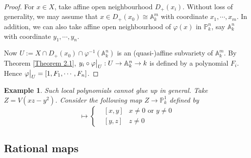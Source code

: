 \documentclass{ctexart}
\newtheorem{example}{Example}[section]
\begin{document}
\begin{proof}
    For $x\in X$, take affine open neighbourhood $D_{+}(x_{i})$.
    Without loss of generality, we may assume that $x\in D_{+}(x_{0}) \cong \mathbb{A}_{k}^{m}$ with coordinate $x_{1}, \cdots, x_{m}$.
    In addition, we can also take affine open neighbourhood of $\varphi(x)$ in $\mathbb{P}_{k}^{n}$, say $\mathbb{A}_{k}^{n}$ with coordinate $y_{1}, \cdots, y_{n}$.
    \par
    Now $U := X \cap D_{+}(x_{0}) \cap \varphi^{-1}(\mathbb{A}_{k}^{n})$ is an (quasi-)affine subvariety of $\mathbb{A}_{k}^{m}$.
    By Theorem \ref{Theorem 2.1}, $y_{i} \circ \varphi\big{|}_{U}: U \rightarrow \mathbb{A}_{k}^{n} \rightarrow k$ is defined by a polynomial $F_{i}$.
    Hence $\varphi\big{|}_{U} = [1, F_{1}, \cdots, F_{n}]$.
\end{proof}
\begin{example}
    Such local polynomials cannot glue up in general.
    Take $Z = V(xz - y^{2})$.
    Consider the following map $Z \rightarrow \mathbb{P}_{k}^{1}$ defined by 
    \begin{equation}
        [x, y, z] \longmapsto
        \left\{
            \begin{aligned}
               & [x, y] & x \neq 0 \text{ or } y \neq 0 \\
               & [y, z] & z \neq 0
            \end{aligned}
        \right.
    \end{equation}
\end{example}

\subsection{Rational maps}
\label{subsection:Projective_Variety_Rational_maps}
\end{document}
